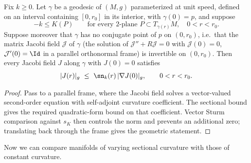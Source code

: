 \begin{lemma}
\label{lem:jacobi-metric-comparison}
\leanok



Fix $k\ge 0$. Let $\gamma$ be a geodesic of $(M,g)$ parameterized at unit
speed, defined on an interval containing $[0,r_0]$ in its interior, with
$\gamma(0)=p$, and suppose
$$-k\le K(P)\qquad\text{for every $2$-plane }P\subset T_{\gamma(r)}M,\quad
0<r<r_0.$$
Suppose moreover that $\gamma$ has no conjugate point of $p$ on $(0,r_0)$,
i.e.\ that the matrix Jacobi field $\mathcal J$ of $\gamma$ (the solution of
$\mathcal J''+R\mathcal J=0$ with $\mathcal J(0)=0$, $\mathcal J'(0)=\Id$ in a
parallel orthonormal frame) is invertible on $(0,r_0)$. Then every Jacobi
field $J$ along $\gamma$ with $J(0)=0$ satisfies
$$|J(r)|_g\ \le\ \sn_k(r)\,|\nabla J(0)|_g,\qquad 0<r<r_0.$$
\end{lemma}

\begin{proof}
\sketch
\leanok
{}
Pass to a parallel frame, where the Jacobi field solves a vector-valued second-order equation with self-adjoint curvature coefficient. The sectional bound gives the required quadratic-form bound on that coefficient. Vector Sturm comparison against $s_K$ then controls the norm and prevents an additional zero; translating back through the frame gives the geometric statement.
\end{proof}


Now we can compare manifolds of varying sectional curvature with
those of constant curvature.


